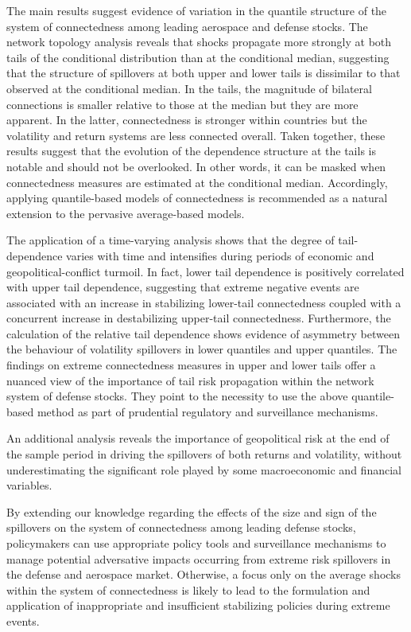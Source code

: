 \documentclass[
  number]{elsarticle}
\begin{document}
The main results suggest evidence of variation in the quantile structure
of the system of connectedness among leading aerospace and defense
stocks. The network topology analysis reveals that shocks propagate more
strongly at both tails of the conditional distribution than at the
conditional median, suggesting that the structure of spillovers at both
upper and lower tails is dissimilar to that observed at the conditional
median. In the tails, the magnitude of bilateral connections is smaller
relative to those at the median but they are more apparent. In the
latter, connectedness is stronger within countries but the volatility
and return systems are less connected overall. Taken together, these
results suggest that the evolution of the dependence structure at the
tails is notable and should not be overlooked. In other words, it can be
masked when connectedness measures are estimated at the conditional
median. Accordingly, applying quantile-based models of connectedness is
recommended as a natural extension to the pervasive average-based
models.

The application of a time-varying analysis shows that the degree of
tail-dependence varies with time and intensifies during periods of
economic and geopolitical-conflict turmoil. In fact, lower tail
dependence is positively correlated with upper tail dependence,
suggesting that extreme negative events are associated with an increase
in stabilizing lower-tail connectedness coupled with a concurrent
increase in destabilizing upper-tail connectedness. Furthermore, the
calculation of the relative tail dependence shows evidence of asymmetry
between the behaviour of volatility spillovers in lower quantiles and
upper quantiles. The findings on extreme connectedness measures in upper
and lower tails offer a nuanced view of the importance of tail risk
propagation within the network system of defense stocks. They point to
the necessity to use the above quantile-based method as part of
prudential regulatory and surveillance mechanisms.

An additional analysis reveals the importance of geopolitical risk at
the end of the sample period in driving the spillovers of both returns
and volatility, without underestimating the significant role played by
some macroeconomic and financial variables.

By extending our knowledge regarding the effects of the size and sign of
the spillovers on the system of connectedness among leading defense
stocks, policymakers can use appropriate policy tools and surveillance
mechanisms to manage potential adversative impacts occurring from
extreme risk spillovers in the defense and aerospace market. Otherwise,
a focus only on the average shocks within the system of connectedness is
likely to lead to the formulation and application of inappropriate and
insufficient stabilizing policies during extreme events.
\end{document}
